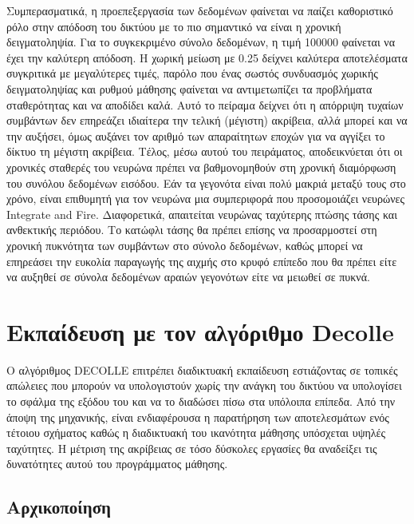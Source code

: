 \documentclass[12pt]{report}
\begin{document}
Συμπερασματικά, η προεπεξεργασία των δεδομένων φαίνεται να παίζει καθοριστικό ρόλο στην απόδοση του δικτύου με το πιο σημαντικό να είναι η χρονική δειγματοληψία. Για το συγκεκριμένο σύνολο δεδομένων, η τιμή 100000 φαίνεται να έχει την καλύτερη απόδοση. Η χωρική μείωση με 0.25 δείχνει καλύτερα αποτελέσματα συγκριτικά με μεγαλύτερες τιμές, παρόλο που ένας σωστός συνδυασμός χωρικής δειγματοληψίας και ρυθμού μάθησης φαίνεται να αντιμετωπίζει τα προβλήματα σταθερότητας και να αποδίδει καλά. Αυτό το πείραμα δείχνει ότι η απόρριψη τυχαίων συμβάντων δεν επηρεάζει ιδιαίτερα την τελική (μέγιστη) ακρίβεια, αλλά μπορεί και να την αυξήσει, όμως αυξάνει τον αριθμό των απαραίτητων εποχών για να αγγίξει το δίκτυο τη μέγιστη ακρίβεια. Τέλος, μέσω αυτού του πειράματος, αποδεικνύεται ότι οι χρονικές σταθερές του νευρώνα πρέπει να βαθμονομηθούν στη χρονική διαμόρφωση του συνόλου δεδομένων εισόδου. Εάν τα γεγονότα είναι πολύ μακριά μεταξύ τους στο χρόνο, είναι επιθυμητή για τον νευρώνα μια συμπεριφορά που προσομοιάζει νευρώνες \textlatin{Integrate and Fire}. Διαφορετικά, απαιτείται νευρώνας ταχύτερης πτώσης τάσης και ανθεκτικής περιόδου. Το κατώφλι τάσης θα πρέπει επίσης να προσαρμοστεί στη χρονική πυκνότητα των συμβάντων στο σύνολο δεδομένων, καθώς μπορεί να επηρεάσει την ευκολία παραγωγής της αιχμής στο κρυφό επίπεδο που θα πρέπει είτε να αυξηθεί σε σύνολα δεδομένων αραιών γεγονότων είτε να μειωθεί σε πυκνά.

\section{Εκπαίδευση με τον αλγόριθμο \textlatin{Decolle}}

Ο αλγόριθμος \textlatin{DECOLLE} \cite{kaiser2020} επιτρέπει διαδικτυακή εκπαίδευση εστιάζοντας σε τοπικές απώλειες που μπορούν να υπολογιστούν χωρίς την ανάγκη του δικτύου να υπολογίσει το σφάλμα της εξόδου του και να το διαδώσει πίσω στα υπόλοιπα επίπεδα. Από την άποψη της μηχανικής, είναι ενδιαφέρουσα η παρατήρηση των αποτελεσμάτων ενός τέτοιου σχήματος καθώς η διαδικτυακή του ικανότητα μάθησης υπόσχεται υψηλές ταχύτητες. Η μέτριση της ακρίβειας σε τόσο δύσκολες εργασίες θα αναδείξει τις δυνατότητες αυτού του προγράμματος μάθησης.

\subsection{Αρχικοποίηση}
\end{document}
